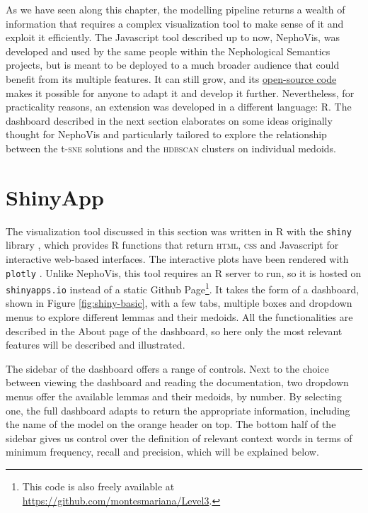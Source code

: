 \documentclass[
]{book}
\begin{document}
As we have seen along this chapter, the modelling pipeline returns a wealth of information that requires a complex visualization tool to make sense of it and exploit it efficiently. The Javascript tool described up to now, NephoVis, was developed and used by the same people within the Nephological Semantics projects, but is meant to be deployed to a much broader audience that could benefit from its multiple features. It can still grow, and its \href{https://github.com/qlvl/NephoVis/}{open-source code} makes it possible for anyone to adapt it and develop it further. Nevertheless, for practicality reasons, an extension was developed in a different language: R. The dashboard described in the next section elaborates on some ideas originally thought for NephoVis and particularly tailored to explore the relationship between the t-\textsc{sne} solutions and the \textsc{hdbscan} clusters on individual medoids.

\hypertarget{shiny}{%
\section{ShinyApp}\label{shiny}}

The visualization tool discussed in this section was written in R with the \texttt{shiny} library \autocite{R-shiny}, which provides R functions that return \textsc{html}, \textsc{css} and Javascript for interactive web-based interfaces. The interactive plots have been rendered with \texttt{plotly} \autocite{R-plotly}. Unlike NephoVis, this tool requires an R server to run, so it is hosted on \texttt{shinyapps.io} instead of a static Github Page\footnote{This code is also freely available at \url{https://github.com/montesmariana/Level3}.}. It takes the form of a dashboard, shown in Figure \ref{fig:shiny-basic}, with a few tabs, multiple boxes and dropdown menus to explore different lemmas and their medoids. All the functionalities are described in the About page of the dashboard, so here only the most relevant features will be described and illustrated.

The sidebar of the dashboard offers a range of controls. Next to the choice between viewing the dashboard and reading the documentation, two dropdown menus offer the available lemmas and their medoids, by number. By selecting one, the full dashboard adapts to return the appropriate information, including the name of the model on the orange header on top. The bottom half of the sidebar gives us control over the definition of relevant context words in terms of minimum frequency, recall and precision, which will be explained below.
\end{document}
